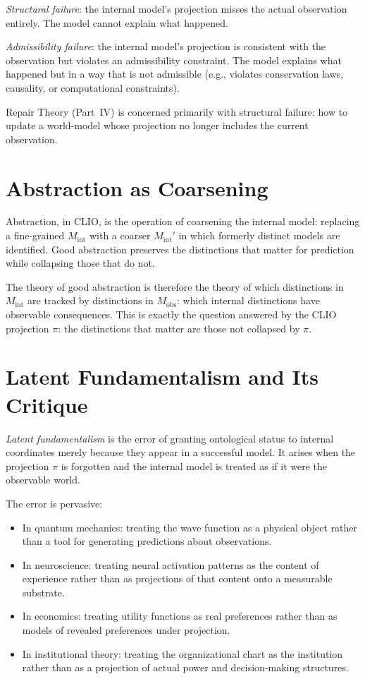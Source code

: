 \documentclass[12pt,a4paper]{book}
\theoremstyle{remark}
\theoremstyle{definition}
\begin{document}
\textit{Structural failure}: the internal model's projection misses the
actual observation entirely. The model cannot explain what happened.

\textit{Admissibility failure}: the internal model's projection is
consistent with the observation but violates an admissibility constraint.
The model explains what happened but in a way that is not admissible
(e.g., violates conservation laws, causality, or computational constraints).

Repair Theory (Part~IV) is concerned primarily with structural failure:
how to update a world-model whose projection no longer includes the
current observation.

\section{Abstraction as Coarsening}

Abstraction, in CLIO, is the operation of coarsening the internal model:
replacing a fine-grained $M_{\mathrm{int}}$ with a coarser
$M_{\mathrm{int}}'$ in which formerly distinct models are identified.
Good abstraction preserves the distinctions that matter for prediction
while collapsing those that do not.

The theory of good abstraction is therefore the theory of which
distinctions in $M_{\mathrm{int}}$ are tracked by distinctions in
$M_{\mathrm{obs}}$: which internal distinctions have observable
consequences. This is exactly the question answered by the CLIO projection
$\pi$: the distinctions that matter are those not collapsed by $\pi$.

\section{Latent Fundamentalism and Its Critique}

\emph{Latent fundamentalism} is the error of granting ontological status
to internal coordinates merely because they appear in a successful model.
It arises when the projection $\pi$ is forgotten and the internal model
is treated as if it were the observable world.

The error is pervasive:
\begin{itemize}
  \item In quantum mechanics: treating the wave function as a physical
        object rather than a tool for generating predictions about
        observations.
  \item In neuroscience: treating neural activation patterns as the
        content of experience rather than as projections of that content
        onto a measurable substrate.
  \item In economics: treating utility functions as real preferences
        rather than as models of revealed preferences under projection.
  \item In institutional theory: treating the organizational chart as
        the institution rather than as a projection of actual power and
        decision-making structures.
\end{itemize}
\end{document}
